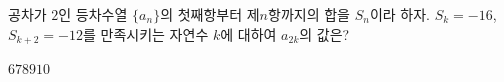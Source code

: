 공차가 $2$인 등차수열 $\{a_n\}$의 첫째항부터 제$n$항까지의 합을 $S_n$이라 하자. $S_k=-16$, $S_{k+2}=-12$를 만족시키는 자연수 $k$에 대하여 $a_{2k}$의 값은?
\begin{choices32}{$6$}{$7$}{$8$}{$9$}{$10$}\end{choices32}

